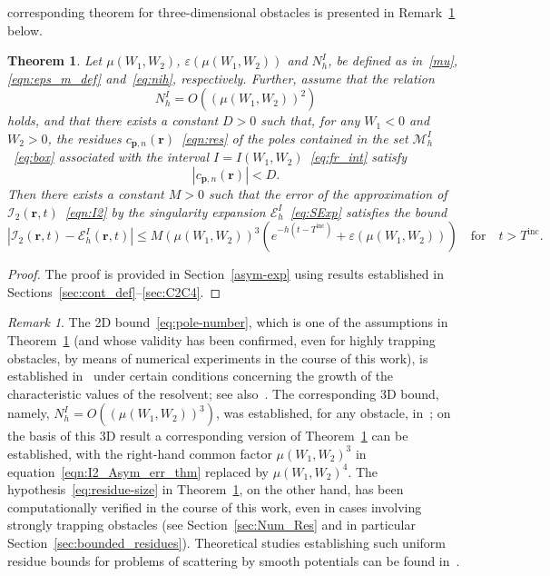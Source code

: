 \documentclass[11pt]{article}
\theoremstyle{plain}
\newtheorem{theorem}{Theorem}
\theoremstyle{remark}
\newtheorem{remark}{Remark}
\def \br{\mathbf{r}}
\def \bp{\mathbf{p}}
\begin{document}
corresponding theorem for three-dimensional obstacles is presented in
Remark~\ref{rmk:growth-assump} below.
\begin{theorem}\label{thm:sing_exp}
  Let $\mu(W_1,W_2)$, $\varepsilon(\mu(W_1,W_2))$ and $N_h^I$, be
  defined as in~\eqref{mu}, \eqref{eqn:eps_m_def} and~\eqref{eq:nih},
  respectively.  Further, assume that the relation
  \begin{equation}
    \label{eq:pole-number}
    N_h^I = O(\left(\mu(W_1,W_2)\right)^2)    
  \end{equation}
  holds, and that there exists a constant $D > 0$ such that, for any
  $W_1 < 0$ and $W_2 > 0$, the residues
  $c_{\bp,n}(\br)$~\eqref{eqn:res} of the poles contained in the set
  $\mathcal{M}_h^I$~\eqref{eq:box} associated with the interval
  $I = I(W_1,W_2)$~\eqref{eq:fr_int} satisfy
  \begin{equation}
    \label{eq:residue-size}
    |c_{\bp,n}(\br)| < D.
  \end{equation}
  Then there exists a constant $M > 0$ such that the error of the
  approximation of $\mathcal{I}_2(\br,t)$~\eqref{eqn:I2} by the
  singularity expansion $\mathcal{E}_h^{I}$~\eqref{eq:SExp} satisfies
  the bound
\begin{equation}\label{eqn:I2_Asym_err_thm}
  |\mathcal{I}_2(\br,t) - \mathcal{E}_h^{I}(\br,t)| \le M (\mu(W_1,W_2))^3 (e^{-h(t - T^\mathrm{inc})} + \varepsilon(\mu(W_1,W_2))) \quad \text{for} \quad t > T^\mathrm{inc}.
\end{equation}
\end{theorem}

\begin{proof}
The proof is provided in Section~\ref{asym-exp} using results established in Sections~\ref{sec:cont_def}--\ref{sec:C2C4}.
\end{proof}

\begin{remark}\label{rmk:growth-assump}
  The 2D bound~\eqref{eq:pole-number}, which is one of the assumptions
  in Theorem~\ref{thm:sing_exp} (and whose validity has been
  confirmed, even for highly trapping obstacles, by means of numerical
  experiments in the course of this work), is established
  in~\cite{vodev1994sharp} under certain conditions concerning the
  growth of the characteristic values of the resolvent; see
  also~\cite[Sec. 4.3]{dyatlov2019mathematical}. The corresponding 3D
  bound, namely, $N^I_h = O((\mu(W_1,W_2))^3)$, was established, for
  any obstacle, in~\cite{melrose1984polynomial}; on the basis of this
  3D result a corresponding version of Theorem~\ref{thm:sing_exp} can
  be established, with the right-hand common factor $\mu(W_1,W_2)^3$
  in equation~\eqref{eqn:I2_Asym_err_thm} replaced by
  $\mu(W_1,W_2)^4$. The hypothesis~\eqref{eq:residue-size} in
  Theorem~\ref{thm:sing_exp}, on the other hand, has been
  computationally verified in the course of this work, even in cases
  involving strongly trapping obstacles (see Section~\ref{sec:Num_Res}
  and in particular Section~\ref{sec:bounded_residues}). Theoretical
  studies establishing such uniform residue bounds for problems of scattering
  by smooth potentials can be found in~\cite{tang2000resonance}.
\end{remark}
\end{document}
